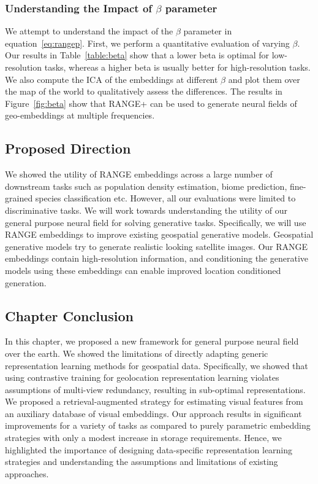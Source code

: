 \subsubsection{Understanding the Impact of $\beta$ parameter}
We attempt to understand the impact of the $\beta$ parameter in equation~\eqref{eq:rangep}. First, we perform a quantitative evaluation of varying $\beta$. Our results in Table~\ref{table:beta} show that a lower beta is optimal for low-resolution tasks, whereas a higher beta is usually better for high-resolution tasks. We also compute the ICA of the embeddings at different $\beta$ and plot them over the map of the world to qualitatively assess the differences. The results in Figure~\ref{fig:beta} show that
RANGE+ can be used to generate neural fields of geo-embeddings at multiple frequencies. 

\subsection{Proposed Direction}
We showed the utility of RANGE embeddings across a large number of downstream tasks such as population density estimation, biome prediction, fine-grained species classification etc. However, all our evaluations were limited to discriminative tasks. We will work towards understanding the utility of our general purpose neural field for solving generative tasks. Specifically, we will use RANGE embeddings to improve existing geospatial generative models. Geospatial generative models try to generate realistic looking satellite images. Our RANGE embeddings contain high-resolution information, and conditioning the generative models using these embeddings can enable improved location conditioned generation.   

\subsection{Chapter Conclusion}
In this chapter, we proposed a new framework for general purpose neural field over the earth. We showed the limitations of directly adapting generic representation learning methods for geospatial data. Specifically, we showed that using contrastive training for geolocation representation learning violates assumptions of multi-view redundancy, resulting in sub-optimal representations. We proposed a retrieval-augmented strategy for estimating visual features from an auxiliary database of visual embeddings. Our approach results in significant improvements for a variety of tasks as compared to purely parametric embedding strategies with only a modest increase in storage requirements. Hence, we highlighted the importance of designing data-specific representation learning strategies and understanding the assumptions and limitations of existing approaches. 